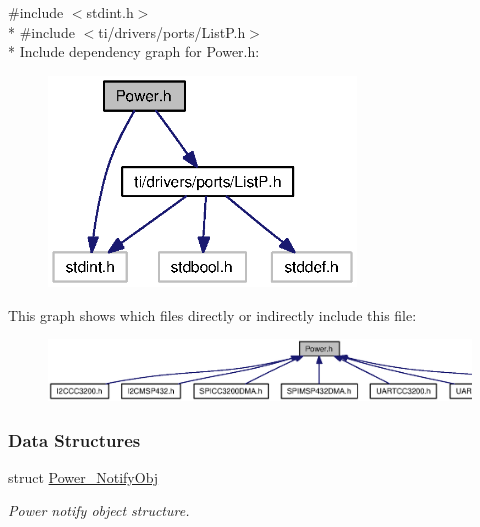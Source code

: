 {\ttfamily \#include $<$stdint.\+h$>$}\\*
{\ttfamily \#include $<$ti/drivers/ports/\+List\+P.\+h$>$}\\*
Include dependency graph for Power.\+h\+:
\nopagebreak
\begin{figure}[H]
\begin{center}
\leavevmode
\includegraphics[width=232pt]{_power_8h__incl}
\end{center}
\end{figure}
This graph shows which files directly or indirectly include this file\+:
\nopagebreak
\begin{figure}[H]
\begin{center}
\leavevmode
\includegraphics[width=350pt]{_power_8h__dep__incl}
\end{center}
\end{figure}
\subsubsection*{Data Structures}
\begin{DoxyCompactItemize}
\item 
struct \hyperlink{struct_power___notify_obj}{Power\+\_\+\+Notify\+Obj}
\begin{DoxyCompactList}\small\item\em Power notify object structure. \end{DoxyCompactList}\end{DoxyCompactItemize}
